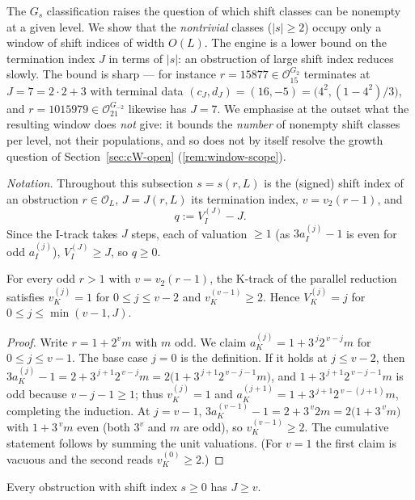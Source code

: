 \documentclass[11pt,reqno]{amsart}
\newcommand{\Obs}{\mathcal{O}}
\newcommand{\Vk}{V_{K}}
\newcommand{\Vi}{V_{I}}
\newcommand{\vk}{v_{K}}
\newcommand{\vtwo}{v_{2}}
\begin{document}
The $G_s$ classification raises the question of which shift classes can be
nonempty at a given level. We show that the \emph{nontrivial} classes
($|s| \ge 2$) occupy only a window of shift indices of width $O(L)$. The engine
is a lower bound on the termination index $J$ in terms of $|s|$: an obstruction
of large shift index reduces slowly. The bound is sharp --- for instance
$r = 15877 \in \Obs_{15}^{G_2}$ terminates at $J = 7 = 2\cdot 2 + 3$ with terminal
data $(c_J, d_J) = (16, -5) = \bigl(4^2, (1-4^2)/3\bigr)$, and
$r = 1015979 \in \Obs_{21}^{G_{-2}}$ likewise has $J = 7$. We emphasise at the
outset what the resulting window does \emph{not} give: it bounds the
\emph{number} of nonempty shift classes per level, not their populations, and so
does not by itself resolve the growth question of Section~\ref{sec:cW-open}
(\cref{rem:window-scope}).

\emph{Notation.} Throughout this subsection $s = s(r, L)$ is the (signed) shift
index of an obstruction $r \in \Obs_L$, $J = J(r, L)$ its termination index,
$v = \vtwo(r-1)$, and
\[
q := \Vi^{(J)} - J .
\]
Since the I-track takes $J$ steps, each of valuation $\ge 1$ (as
$3 a_I^{(j)} - 1$ is even for odd $a_I^{(j)}$), $\Vi^{(J)} \ge J$, so $q \ge 0$.

\begin{lemma}\label{lem:k-prefix}
For every odd $r > 1$ with $v = \vtwo(r-1)$, the K-track of the parallel reduction
satisfies $\vk^{(j)} = 1$ for $0 \le j \le v-2$ and $\vk^{(v-1)} \ge 2$. Hence
$\Vk^{(j)} = j$ for $0 \le j \le \min(v-1, J)$.
\end{lemma}

\begin{proof}
Write $r = 1 + 2^v m$ with $m$ odd. We claim $a_K^{(j)} = 1 + 3^{\,j} 2^{\,v-j} m$
for $0 \le j \le v-1$. The base case $j = 0$ is the definition. If it holds at
$j \le v-2$, then
$3 a_K^{(j)} - 1 = 2 + 3^{\,j+1} 2^{\,v-j} m = 2\bigl(1 + 3^{\,j+1} 2^{\,v-j-1} m\bigr)$,
and $1 + 3^{\,j+1} 2^{\,v-j-1} m$ is odd because $v-j-1 \ge 1$; thus
$\vk^{(j)} = 1$ and $a_K^{(j+1)} = 1 + 3^{\,j+1} 2^{\,v-(j+1)} m$, completing the
induction. At $j = v-1$,
$3 a_K^{(v-1)} - 1 = 2 + 3^{\,v} 2 m = 2\bigl(1 + 3^{\,v} m\bigr)$ with
$1 + 3^{\,v} m$ even (both $3^v$ and $m$ are odd), so $\vk^{(v-1)} \ge 2$. The
cumulative statement follows by summing the unit valuations. (For $v = 1$ the
first claim is vacuous and the second reads $\vk^{(0)} \ge 2$.)
\qedhere
\end{proof}

\begin{lemma}\label{lem:depth-min}
Every obstruction with shift index $s \ge 0$ has $J \ge v$.
\end{lemma}
\end{document}
